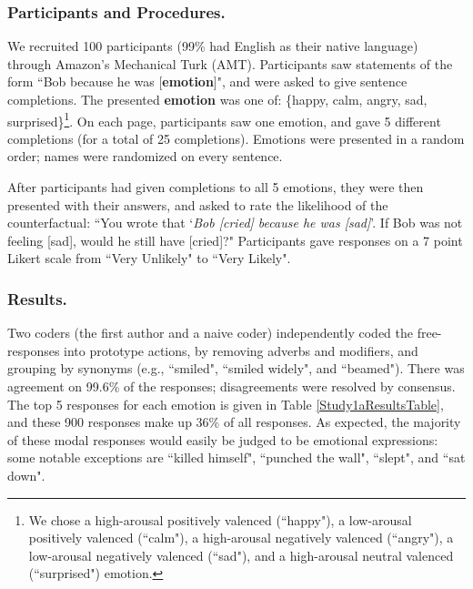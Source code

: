 \documentclass[10pt,letterpaper]{article}
\newcommand{\ndg}[1]{\textcolor{Green}{[ndg: #1]}}
\begin{document}
\subsubsection{Participants and Procedures.} 
We recruited 100 participants (99\% had English as their native language) through Amazon's Mechanical Turk (AMT). Participants saw statements of the form ``Bob \underline{\hspace{2em}} because he was [\textbf{emotion}]", and were asked to give sentence completions. The presented \textbf{emotion} was one of: \{happy, calm, angry, sad, surprised\}\footnote{We chose a high-arousal positively valenced (``happy"), a low-arousal positively valenced (``calm"), a high-arousal negatively valenced (``angry"), a low-arousal negatively valenced (``sad"), and a high-arousal neutral valenced (``surprised") emotion.}. On each page, participants saw one emotion, and gave 5 different completions (for a total of 25 completions). Emotions were presented in a random order; names were randomized on every sentence.

After participants had given completions to all 5 emotions, they were then presented with their answers, and asked to rate the likelihood of the counterfactual: ``You wrote that `\textit{Bob [cried] because he was [sad]}'. If Bob was not feeling [sad], would he still have [cried]?" Participants gave responses on a 7 point Likert scale from ``Very Unlikely" to ``Very Likely". 



\subsubsection{Results.} 
Two coders (the first author and a naive coder) independently coded the free-responses into prototype actions, by removing adverbs and modifiers, and grouping by synonyms (e.g., ``smiled", ``smiled widely", and ``beamed"). There was agreement on 99.6\% of the responses; disagreements were resolved by consensus.
The top 5 responses for each emotion is given in Table \ref{Study1aResultsTable}, and these 900 responses make up 36\% of all responses. 
As expected, the majority of these modal responses would easily be judged to be emotional expressions: some notable exceptions are ``killed himself", ``punched the wall", ``slept", and ``sat down".
\end{document}
